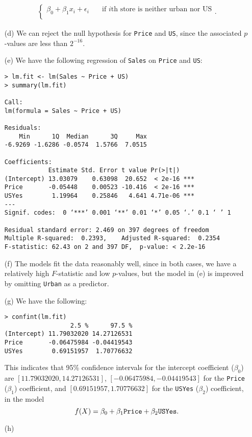 \begin{itemize}
\begin{equation*}
\begin{split}
\begin{cases}
                    \beta_0 + \beta_1x_i + \epsilon_i \quad 
                        &\text{if $i$th store is neither urban nor US} \\
                \end{cases}.
            \end{split}
        \end{equation*}
    \item[(d)] We can reject the null hypothesis for \verb|Price| and \verb|US|, since 
        the associated $p$-values are less than $2^{-16}$.
    \item[(e)] We have the following regression of \verb|Sales| on \verb|Price| and
        \verb|US|:
        \scriptsize\begin{verbatim}
> lm.fit <- lm(Sales ~ Price + US)
> summary(lm.fit)

Call:
lm(formula = Sales ~ Price + US)

Residuals:
    Min      1Q  Median      3Q     Max 
-6.9269 -1.6286 -0.0574  1.5766  7.0515 

Coefficients:
            Estimate Std. Error t value Pr(>|t|)    
(Intercept) 13.03079    0.63098  20.652  < 2e-16 ***
Price       -0.05448    0.00523 -10.416  < 2e-16 ***
USYes        1.19964    0.25846   4.641 4.71e-06 ***
---
Signif. codes:  0 ‘***’ 0.001 ‘**’ 0.01 ‘*’ 0.05 ‘.’ 0.1 ‘ ’ 1

Residual standard error: 2.469 on 397 degrees of freedom
Multiple R-squared:  0.2393,    Adjusted R-squared:  0.2354 
F-statistic: 62.43 on 2 and 397 DF,  p-value: < 2.2e-16
        \end{verbatim}\normalsize
    \item[(f)] The models fit the data reasonably well, since in both cases, we 
        have a relatively high $F$-statistic and low $p$-values, but the model 
        in (e) is improved by omitting \verb|Urban| as a predictor.
    \item[(g)] We have the following:
        \scriptsize\begin{verbatim}
> confint(lm.fit)
                  2.5 %      97.5 %
(Intercept) 11.79032020 14.27126531
Price       -0.06475984 -0.04419543
USYes        0.69151957  1.70776632
        \end{verbatim}\normalsize
        This indicates that 95\% confidence intervals for the intercept coefficient 
        ($\beta_0$) are $[11.79032020,14.27126531]$, $[-0.06475984, -0.04419543]$ 
        for the \verb|Price| ($\beta_1$) coefficient, and $[0.69151957, 1.70776632]$ 
        for the \verb|USYes| ($\beta_2$) coefficient, in the model
        \[
            f(X) = \beta_0 + \beta_1\verb|Price| + \beta_2\verb|USYes|.
        \]
    \item[(h)] 
\end{itemize}

